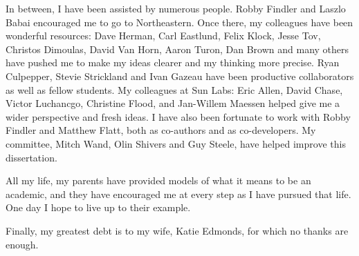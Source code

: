 In between, I have been assisted by numerous people.  Robby Findler
and Laszlo Babai encouraged me to go to Northeastern.  Once there, my
colleagues have been wonderful resources: Dave Herman, Carl Eastlund,
Felix Klock, Jesse Tov, Christos Dimoulas, David Van Horn, Aaron
Turon, Dan Brown and 
many others have pushed me to make my ideas clearer and my thinking
more precise.  Ryan Culpepper, Stevie Strickland and Ivan Gazeau have been
productive collaborators as well as fellow students.  My colleagues at
Sun Labs: Eric Allen, David Chase, Victor Luchancgo, Christine Flood,
and Jan-Willem Maessen helped give me a wider perspective
and fresh ideas.  I have also been fortunate to work with Robby Findler
and Matthew Flatt, both as co-authors and as co-developers.  My
committee, Mitch Wand, Olin Shivers and Guy Steele, have helped improve
this dissertation.

All my life, my parents have provided models of what it means to be an
academic, and they have encouraged me at every step as I have pursued
that life.  One day I hope to live up to their example.

Finally, my greatest debt is to my wife, Katie Edmonds, for which no
thanks are enough.

